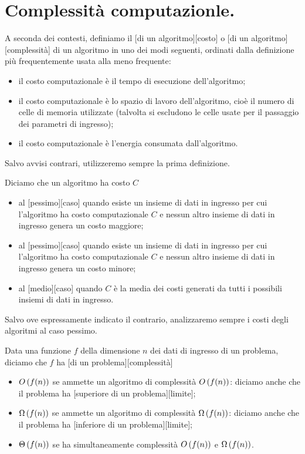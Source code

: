 \section{Complessit\`a computazionle.}
\label{AlgoritmiEStruttureDiDati_ComplessitaComputazionale}
\begin{Definition}
	A seconda dei contesti, definiamo il [di un algoritmo][costo] o [di un algoritmo][complessit\`a] di un algoritmo in uno dei modi seguenti, ordinati dalla definizione pi\`u frequentemente usata alla meno frequente:
	\begin{itemize}
		\item il costo computazionale \`e il tempo di esecuzione dell'algoritmo;
		\item il costo computazionale \`e lo spazio di lavoro dell'algoritmo, cio\`e il numero di celle di memoria utilizzate (talvolta si escludono le celle usate per il passaggio dei parametri di ingresso);
		\item il costo computazionale \`e l'energia consumata dall'algoritmo.
	\end{itemize}
	Salvo avvisi contrari, utilizzeremo sempre la prima definizione.
\end{Definition}
\begin{Definition}
	Diciamo che un algoritmo ha costo $C$
	\begin{itemize}
		\item al [pessimo][caso] quando esiste un insieme di
dati in ingresso per cui l'algoritmo ha costo computazionale $C$ e nessun altro
insieme di dati in ingresso genera un costo maggiore;
		\item al [pessimo][caso] quando esiste un insieme di
dati in ingresso per cui l'algoritmo ha costo computazionale $C$ e nessun altro
insieme di dati in ingresso genera un costo minore;
		\item al [medio][caso] quando $C$ \`e la media dei costi
generati da tutti i possibili insiemi di dati in ingresso.
	\end{itemize}
\end{Definition}
\par Salvo ove espressamente indicato il contrario, analizzaremo sempre i costi
degli algoritmi al caso pessimo.
\begin{Definition}
	Data una funzione $f$ della dimensione $n$ dei dati di ingresso di un problema, diciamo che $f$ ha [di un problema][complessit\`a]
	\begin{itemize}
		\item $O \left ( f(n) \right )$ se ammette un algoritmo di complessit\`a $O \left ( f(n) \right )$: diciamo anche che il problema ha [superiore di un problema][limite];
		\item $\Omega \left ( f(n) \right )$ se ammette un algoritmo di complessit\`a $\Omega \left ( f(n) \right )$: diciamo anche che il problema ha [inferiore di un problema][limite];
		\item $\Theta \left ( f(n) \right )$ se ha simultaneamente complessit\`a $O \left ( f(n) \right )$ e $\Omega \left ( f(n) \right )$.
	\end{itemize}
\end{Definition}
